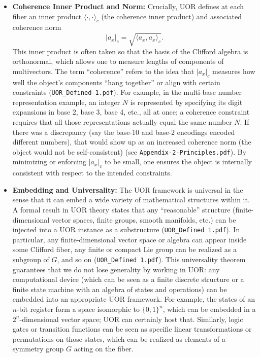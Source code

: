 \documentclass[11pt]{article}
\begin{document}
\begin{itemize}
    \item \textbf{Coherence Inner Product and Norm:} Crucially, UOR defines at each fiber an inner product \(\langle \cdot,\cdot \rangle_c\) (the coherence inner product) and associated coherence norm 
    \[
    |a_x|_c = \sqrt{\langle a_x, a_x \rangle_c}.
    \]
    This inner product is often taken so that the basis of the Clifford algebra is orthonormal, which allows one to measure lengths of components of multivectors. The term “coherence” refers to the idea that \(|a_x|_c\) measures how well the object’s components “hang together” or align with certain constraints (\texttt{UOR\_Defined 1.pdf}). For example, in the multi-base number representation example, an integer \(N\) is represented by specifying its digit expansions in base 2, base 3, base 4, etc., all at once; a coherence constraint requires that all those representations actually equal the same number \(N\). If there was a discrepancy (say the base-10 and base-2 encodings encoded different numbers), that would show up as an increased coherence norm (the object would not be self-consistent) (see \texttt{Appendix-2-Principles.pdf}). By minimizing or enforcing \(|a_x|_c\) to be small, one ensures the object is internally consistent with respect to the intended constraints.
    \item \textbf{Embedding and Universality:} The UOR framework is universal in the sense that it can embed a wide variety of mathematical structures within it. A formal result in UOR theory states that any “reasonable” structure (finite-dimensional vector spaces, finite groups, smooth manifolds, etc.) can be injected into a UOR instance as a substructure (\texttt{UOR\_Defined 1.pdf}). In particular, any finite-dimensional vector space or algebra can appear inside some Clifford fiber, any finite or compact Lie group can be realized as a subgroup of \(G\), and so on (\texttt{UOR\_Defined 1.pdf}). This universality theorem guarantees that we do not lose generality by working in UOR: any computational device (which can be seen as a finite discrete structure or a finite state machine with an algebra of states and operations) can be embedded into an appropriate UOR framework. For example, the states of an \(n\)-bit register form a space isomorphic to \(\{0,1\}^n\), which can be embedded in a \(2^n\)-dimensional vector space; UOR can certainly host that. Similarly, logic gates or transition functions can be seen as specific linear transformations or permutations on those states, which can be realized as elements of a symmetry group \(G\) acting on the fiber.
\end{itemize}
\end{document}
